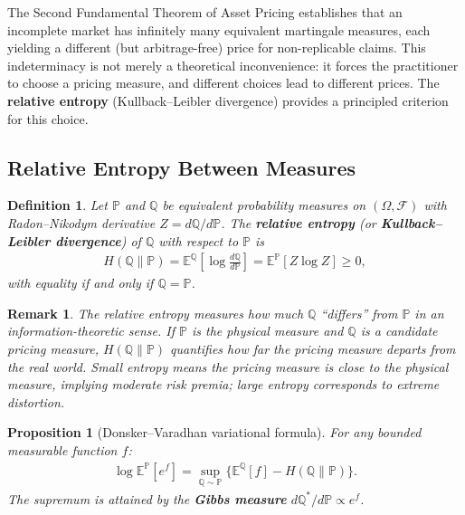 \documentclass{report}
\theoremstyle{spacedplain}
\newtheorem{proposition}[theorem]{Proposition}
\theoremstyle{spaceddefinition}
\newtheorem{definition}[theorem]{Definition}
\theoremstyle{spacedremark}
\newtheorem{remark}[theorem]{Remark}
\begin{document}
The Second Fundamental Theorem of Asset Pricing establishes that an incomplete market has infinitely many equivalent martingale measures, each yielding a different (but arbitrage-free) price for non-replicable claims. This indeterminacy is not merely a theoretical inconvenience: it forces the
practitioner to choose a pricing measure, and different choices lead to different prices. The \textbf{relative entropy} (Kullback--Leibler divergence) provides a principled criterion for this choice.
 
\subsection{Relative Entropy Between Measures}
 
\begin{definition}
Let $\mathbb{P}$ and $\mathbb{Q}$ be equivalent probability measures on $(\Omega, \mathcal{F})$ with Radon--Nikodym derivative $Z = d\mathbb{Q}/d\mathbb{P}$. The \textbf{relative entropy} (or \textbf{Kullback--Leibler divergence}) of $\mathbb{Q}$ with respect to $\mathbb{P}$ is
\begin{align}
    H(\mathbb{Q} \| \mathbb{P}) = \mathbb{E}^{\mathbb{Q}}\!\left[\log
    \frac{d\mathbb{Q}}{d\mathbb{P}}\right] = \mathbb{E}^{\mathbb{P}}[Z \log Z] \geq 0,
\end{align}
with equality if and only if $\mathbb{Q} = \mathbb{P}$.
\end{definition}
 
\begin{remark}
The relative entropy measures how much $\mathbb{Q}$ ``differs'' from $\mathbb{P}$ in an information-theoretic sense. If $\mathbb{P}$ is the physical measure and $\mathbb{Q}$ is a candidate pricing measure, $H(\mathbb{Q}\|\mathbb{P})$ quantifies how far the pricing measure departs from the real world. Small entropy
means the pricing measure is close to the physical measure, implying moderate risk premia; large entropy corresponds to extreme distortion.
\end{remark}
 
\begin{proposition}[Donsker--Varadhan variational formula]
For any bounded measurable function $f$:
\begin{align}
    \log \mathbb{E}^{\mathbb{P}}[e^f] = \sup_{\mathbb{Q} \sim \mathbb{P}}
    \bigl\{\mathbb{E}^{\mathbb{Q}}[f] - H(\mathbb{Q}\|\mathbb{P})\bigr\}.
\end{align}
The supremum is attained by the \textbf{Gibbs measure}
$d\mathbb{Q}^*/d\mathbb{P} \propto e^f$.
\end{proposition}
 
\end{document}
